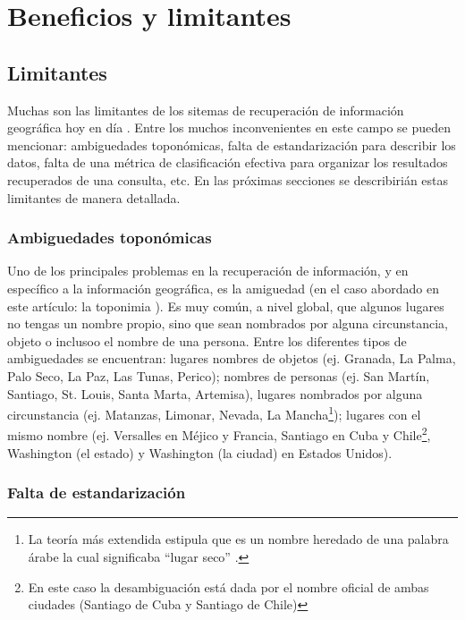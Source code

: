 \section{Beneficios y limitantes}\label{sec:pros-and-cons}

\subsection{Limitantes}\label{sec:limit}

Muchas son las limitantes de los sitemas de recuperación de información
geográfica hoy en día \cite{purves2011,purves2004}. Entre los muchos
inconvenientes en este campo se pueden mencionar: ambiguedades toponómicas,
falta de estandarización para describir los datos, falta de una métrica de
clasificación efectiva para organizar los resultados recuperados de una
consulta, etc. En las próximas secciones se describirián estas limitantes de
manera detallada.

\subsubsection{Ambiguedades toponómicas}\label{sec:ambig}

Uno de los principales problemas en la recuperación de información, y en
específico a la información geográfica, es la amiguedad (en el caso abordado en
este artículo: la toponimia \cite{buscaldi2009}). Es muy común, a nivel global,
que algunos lugares no tengas un nombre propio, sino que sean nombrados por
alguna circunstancia, objeto o inclusoo el nombre de una persona. Entre los
diferentes tipos de ambiguedades se encuentran: lugares nombres de objetos (ej.
Granada, La Palma, Palo Seco, La Paz, Las Tunas, Perico); nombres de personas
(ej. San Martín, Santiago, St. Louis, Santa Marta, Artemisa), lugares nombrados
por alguna circunstancia (ej. Matanzas, Limonar, Nevada, La Mancha\footnote{La
teoría más extendida estipula que es un nombre heredado de una palabra árabe la
cual significaba ``lugar seco'' \cite{laMancha}.}); lugares con el mismo nombre
(ej. Versalles en Méjico y Francia, Santiago en Cuba y Chile\footnote{En este
caso la desambiguación está dada por el nombre oficial de ambas ciudades
(Santiago de Cuba y Santiago de Chile)}, Washington (el estado) y Washington (la
ciudad) en Estados Unidos).

\subsubsection{Falta de estandarización}\label{sec:estand}

